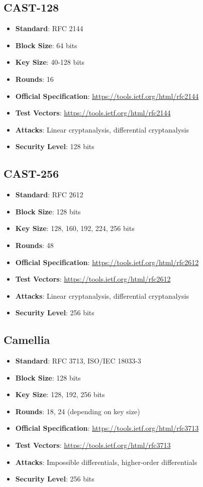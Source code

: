\documentclass[11pt,a4paper]{article}
\begin{document}
\subsection{CAST-128}
\begin{itemize}
    \item \textbf{Standard}: RFC 2144
    \item \textbf{Block Size}: 64 bits
    \item \textbf{Key Size}: 40-128 bits
    \item \textbf{Rounds}: 16
    \item \textbf{Official Specification}: \url{https://tools.ietf.org/html/rfc2144}
    \item \textbf{Test Vectors}: \url{https://tools.ietf.org/html/rfc2144}
    \item \textbf{Attacks}: Linear cryptanalysis, differential cryptanalysis
    \item \textbf{Security Level}: 128 bits
\end{itemize}

\subsection{CAST-256}
\begin{itemize}
    \item \textbf{Standard}: RFC 2612
    \item \textbf{Block Size}: 128 bits
    \item \textbf{Key Size}: 128, 160, 192, 224, 256 bits
    \item \textbf{Rounds}: 48
    \item \textbf{Official Specification}: \url{https://tools.ietf.org/html/rfc2612}
    \item \textbf{Test Vectors}: \url{https://tools.ietf.org/html/rfc2612}
    \item \textbf{Attacks}: Linear cryptanalysis, differential cryptanalysis
    \item \textbf{Security Level}: 256 bits
\end{itemize}

\subsection{Camellia}
\begin{itemize}
    \item \textbf{Standard}: RFC 3713, ISO/IEC 18033-3
    \item \textbf{Block Size}: 128 bits
    \item \textbf{Key Size}: 128, 192, 256 bits
    \item \textbf{Rounds}: 18, 24 (depending on key size)
    \item \textbf{Official Specification}: \url{https://tools.ietf.org/html/rfc3713}
    \item \textbf{Test Vectors}: \url{https://tools.ietf.org/html/rfc3713}
    \item \textbf{Attacks}: Impossible differentials, higher-order differentials
    \item \textbf{Security Level}: 256 bits
\end{itemize}
\end{document}
